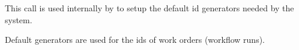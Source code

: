 This call is used internally by \Rapture to setup the default id generators needed by the system.

Default generators are used for the ids of work orders (workflow runs).
